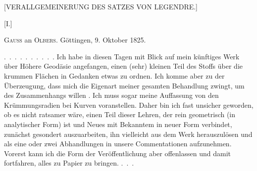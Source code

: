 \clearpage
{}
\begin{center}\large [VERALLGEMEINERUNG DES SATZES VON LEGENDRE.]\end{center}
\begin{center}[I.]\end{center}
\begin{center}\textsc{Gauss} an \textsc{Olbers}. Göttingen, 9. Oktober 1825.\end{center}
\indent\mbox{. . . . . . . . . .} Ich habe in diesen Tagen mit Blick auf mein künftiges Werk über Höhere Geodäsie angefangen, einen (sehr) kleinen Teil des Stoffs über die krummen Flächen in Gedanken etwas zu ordnen. Ich komme aber zu der Überzeugung, dass mich die Eigenart meiner gesamten Behandlung zwingt, um des Zusammenhangs willen . Ich muss sogar meine Auffassung von den Krümmungsradien bei  Kurven voranstellen. Daher bin ich fast unsicher geworden, ob es nicht ratsamer wäre, einen Teil dieser Lehren, der rein geometrisch (in analytischer Form) ist und Neues mit Bekanntem in neuer Form verbindet, zunächst gesondert auszuarbeiten, ihn vielleicht aus dem Werk herauszulösen und als eine oder zwei Abhandlungen in unsere Commentationen aufzunehmen. Vorerst kann ich die Form der Veröffentlichung aber offenlassen und damit fortfahren, alles zu Papier zu bringen. \mbox{. . .}
